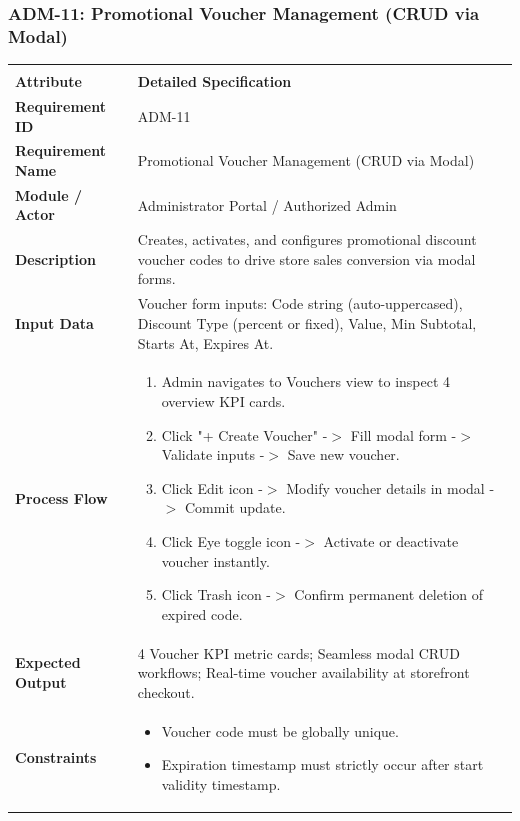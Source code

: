 \documentclass[12pt,a4paper,oneside]{report}
\begin{document}
\subsubsection{ADM-11: Promotional Voucher Management (CRUD via Modal)}
\begin{longtable}{|p{3.6cm}|p{11.9cm}|}
\hline
\rowcolor{PrimaryBrown}
\multicolumn{2}{|p{15.5cm}|}{\textbf{\textcolor{white}{Functional Specification: ADM-11 -- Promotional Voucher Management (CRUD via Modal)}}} \\
\hline
\endfirsthead
\hline
\rowcolor{PrimaryBrown}
\multicolumn{2}{|p{15.5cm}|}{\textbf{\textcolor{white}{Functional Specification: ADM-11 (Continued)}}} \\
\hline
\textbf{Attribute} & \textbf{Detailed Specification} \\
\hline
\endhead
\hline
\endfoot
\textbf{Requirement ID} & ADM-11 \\
\hline
\textbf{Requirement Name} & Promotional Voucher Management (CRUD via Modal) \\
\hline
\textbf{Module / Actor} & Administrator Portal / Authorized Admin \\
\hline
\textbf{Description} & Creates, activates, and configures promotional discount voucher codes to drive store sales conversion via modal forms. \\
\hline
\textbf{Input Data} & Voucher form inputs: Code string (auto-uppercased), Discount Type (percent or fixed), Value, Min Subtotal, Starts At, Expires At. \\
\hline
\textbf{Process Flow} & \begin{enumerate}[leftmargin=*,nosep,topsep=2pt]
  \item Admin navigates to Vouchers view to inspect 4 overview KPI cards.
  \item Click "+ Create Voucher" -$>$ Fill modal form -$>$ Validate inputs -$>$ Save new voucher.
  \item Click Edit icon -$>$ Modify voucher details in modal -$>$ Commit update.
  \item Click Eye toggle icon -$>$ Activate or deactivate voucher instantly.
  \item Click Trash icon -$>$ Confirm permanent deletion of expired code.
\end{enumerate} \\
\hline
\textbf{Expected Output} & 4 Voucher KPI metric cards; Seamless modal CRUD workflows; Real-time voucher availability at storefront checkout. \\
\hline
\textbf{Constraints} & \begin{itemize}[leftmargin=*,nosep,topsep=2pt]
  \item Voucher code must be globally unique.
  \item Expiration timestamp must strictly occur after start validity timestamp.
\end{itemize} \\
\hline
\end{longtable}
\end{document}
